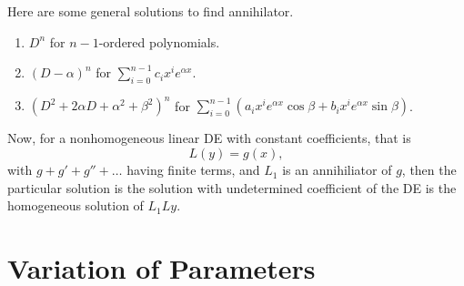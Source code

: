 \documentclass[12pt,a4paper]{report}
\theoremstyle{definition}
\theoremstyle{remark}
\begin{document}
Here are some general solutions to find annihilator.

\begin{enumerate}
    \item $D^n$ for $n - 1$-ordered polynomials.
    \item $(D - \alpha)^n$ for $\displaystyle\sum_{i = 0}^{n - 1} c_i x^i e^{\alpha x}.$
    \item $(D^2 + 2\alpha D + \alpha^2 + \beta^2)^n$ for $\displaystyle\sum_{i = 0}^{n - 1} (a_i x^i e^{\alpha x} \cos \beta + b_i x^i e^{\alpha x} \sin \beta)$.
\end{enumerate}

Now, for a nonhomogeneous linear DE with constant coefficients, that is
\[L(y)= g(x),\]
with $g + g' + g'' +\ldots$ having finite terms, and $L_1$ is an annihiliator of $g$, then the particular solution is the solution with undetermined coefficient of the DE is the homogeneous solution of $L_1Ly.$

\section{Variation of Parameters}
\end{document}
